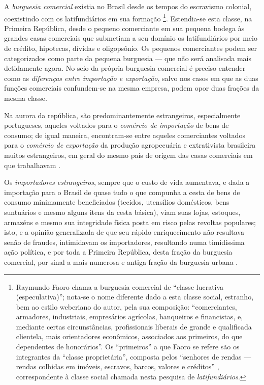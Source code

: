 A \textit{burguesia comercial} existia no Brasil desde os tempos do escravismo colonial, coexistindo com os latifundiários em sua formação \cite[p.~237]{faoro_donos_2001} \footnote{Raymundo Faoro chama a burguesia comercial de ``classe lucrativa (especulativa)''; nota-se o nome diferente dado a esta classe social, estranho, bem ao estilo weberiano do autor, pela sua composição: ``comerciantes, armadores, industriais, empresários agrícolas, banqueiros e financistas, e, mediante certas circunstâncias, profissionais liberais de grande e qualificada clientela, mais orientadores econômicos, associados aos primeiros, do que dependentes de honorários''. Os ``primeiros'' a que Faoro se refere são os integrantes da ``classe proprietária'', composta pelos ``senhores de rendas --- rendas colhidas em imóveis, escravos, barcos, valores e créditos'' \cite[p.~237]{faoro_donos_2001}, correspondente à classe social chamada nesta pesquisa de \textit{latifundiários}.}. Estendia-se esta classe, na Primeira República, desde o pequeno comerciante em sua pequena bodega às grandes casas comerciais que submetiam a seu domínio os latifundiários por meio de crédito, hipotecas, dívidas e oligopsônio. Os pequenos comerciantes podem ser categorizados como parte da pequena burguesia --- que não será analisada mais detidamente agora. No seio da própria burguesia comercial é preciso entender como as \textit{diferenças entre importação e exportação}, salvo nos casos em que as duas funções comerciais confundem-se na mesma empresa, podem opor duas frações da mesma classe. 

Na aurora da república, são predominantemente estrangeiros, especialmente portugueses, aqueles voltados para o \textit{comércio de importação} de bens de consumo; de igual maneira, encontram-se entre aqueles comerciantes voltados para o \textit{comércio de exportação} da produção agropecuária e extrativista brasileira muitos estrangeiros, em geral do mesmo país de origem das casas comerciais em que trabalhavam \cite[p.~158]{CARONE1970inst}. 

Os \textit{importadores estrangeiros}, sempre que o custo de vida aumentava, e dada a importação para o Brasil de quase tudo o que compunha a cesta de bens de consumo minimamente beneficiados (tecidos, utensílios domésticos, bens suntuários e mesmo alguns itens da cesta básica), viam suas lojas, estoques, armazéns e mesmo sua integridade física posta em risco pelas revoltas populares; isto, e a opinião generalizada de que seu rápido enriquecimento não resultava senão de fraudes, intimidavam os importadores, resultando numa timidíssima ação política, e por toda a Primeira República, desta fração da burguesia comercial, por sinal a mais numerosa e antiga fração da burguesia urbana \cite[pp.~158-159]{CARONE1970inst}. 

